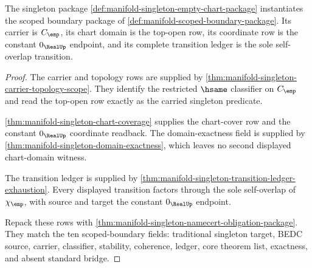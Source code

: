 \begin{theorem}
\label{thm:manifold-singleton-scoped-boundary-instance}
The singleton package
\autoref{def:manifold-singleton-empty-chart-package} instantiates the scoped
boundary package of \autoref{def:manifold-scoped-boundary-package}. Its carrier
is $C_{\emp}$, its chart domain is the top-open row, its coordinate row is the
constant $0_{\RealUp}$ endpoint, and its complete transition ledger is the sole
self-overlap transition.
\end{theorem}
\begin{proof}
The carrier and topology rows are supplied by
\autoref{thm:manifold-singleton-carrier-topology-scope}. They identify the
restricted $\hsame$ classifier on $C_{\emp}$ and read the top-open row exactly
as the carried singleton predicate.

\autoref{thm:manifold-singleton-chart-coverage} supplies the chart-cover row
and the constant $0_{\RealUp}$ coordinate readback. The domain-exactness field
is supplied by \autoref{thm:manifold-singleton-domain-exactness}, which leaves
no second displayed chart-domain witness.

The transition ledger is supplied by
\autoref{thm:manifold-singleton-transition-ledger-exhaustion}. Every displayed
transition factors through the sole self-overlap of $\chi_{\emp}$, with source
and target the constant $0_{\RealUp}$ endpoint.

Repack these rows with
\autoref{thm:manifold-singleton-namecert-obligation-package}. They match the
ten scoped-boundary fields: traditional singleton target, BEDC source,
carrier, classifier, stability, coherence, ledger, core theorem list,
exactness, and absent standard bridge.
\end{proof}
